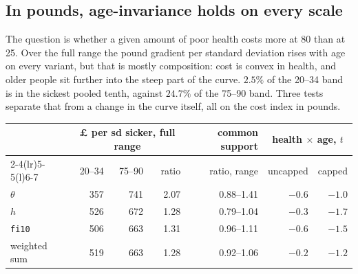 \documentclass[11pt]{article}
\newcommand{\code}[1]{\texttt{\small #1}}
\begin{document}
\subsection{In pounds, age-invariance holds on every scale}
\label{sec:invariance}

The question is whether a given amount of poor health costs more at 80 than at 25. Over the full range the pound gradient per standard deviation rises with age on every variant, but that is mostly composition: cost is convex in health, and older people sit further into the steep part of the curve. $2.5\%$ of the 20--34 band is in the sickest pooled tenth, against $24.7\%$ of the 75--90 band. Three tests separate that from a change in the curve itself, all on the cost index in pounds.

\begin{center}\small
\begin{tabular}{lrrrrrr}
\toprule
 & \multicolumn{3}{c}{\pounds{} per sd sicker, full range} & common support & \multicolumn{2}{c}{health $\times$ age, $t$} \\
\cmidrule(lr){2-4}\cmidrule(lr){5-5}\cmidrule(l){6-7}
 & 20--34 & 75--90 & ratio & ratio, range & uncapped & capped \\
\midrule
$\theta$ & 357 & 741 & 2.07 & 0.88--1.41 & $-0.6$ & $-1.0$ \\
$h$ & 526 & 672 & 1.28 & 0.79--1.04 & $-0.3$ & $-1.7$ \\
\code{fi10} & 506 & 663 & 1.31 & 0.96--1.11 & $-0.6$ & $-1.5$ \\
weighted sum & 519 & 663 & 1.28 & 0.92--1.06 & $-0.2$ & $-1.2$ \\
\bottomrule
\end{tabular}
\end{center}
\end{document}

